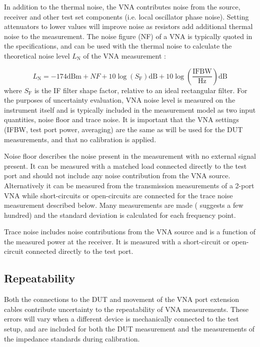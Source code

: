 \documentclass[../thesis/thesis.tex]{subfiles}
\begin{document}
In addition to the thermal noise, the VNA contributes noise from the source, receiver and other test set components (i.e. local oscillator phase noise). Setting attenuators to lower values will improve noise as resistors add additional thermal noise to the measurement. The noise figure (NF) of a VNA is typically quoted in the specifications, and can be used with the thermal noise to calculate the theoretical noise level $L_\textrm{N}$ of the VNA measurement \cite{Hiebel_2008}:

\begin{equation}
	L_\textrm{N} = -174 \textrm{dBm} + NF + 10\log(S_\textrm{F})\textrm{dB} + 10\log\left(\frac{\textrm{IFBW}}{\textrm{Hz}}\right)\textrm{dB}
\end{equation}
where $S_\textrm{F}$ is the IF filter shape factor, relative to an ideal rectangular filter. For the purposes of uncertainty evaluation, VNA noise level is measured on the instrument itself and is typically included in the measurement model as two input quantities, noise floor and trace noise. It is important that the VNA settings (IFBW, test port power, averaging) are the same as will be used for the DUT measurements, and that no calibration is applied.

Noise floor describes the noise present in the measurement with no external signal present. It can be measured with a matched load connected directly to the test port and should not include any noise contribution from the VNA source. Alternatively it can be measured from the transmission measurements of a 2-port VNA while short-circuits or open-circuits are connected for the trace noise measurement described below. Many measurements are made (\cite{EURAMET_2011} suggests a few hundred) and the standard deviation is calculated for each frequency point.

Trace noise includes noise contributions from the VNA source and is a function of the measured power at the receiver. It is measured with a short-circuit or open-circuit connected directly to the test port.

\subsection{Repeatability}

Both the connections to the DUT and movement of the VNA port extension cables contribute uncertainty to the repeatability of VNA measurements. These errors will vary when a different device is mechanically connected to the test setup, and are included for both the DUT measurement and the measurements of the impedance standards during calibration.
\end{document}
